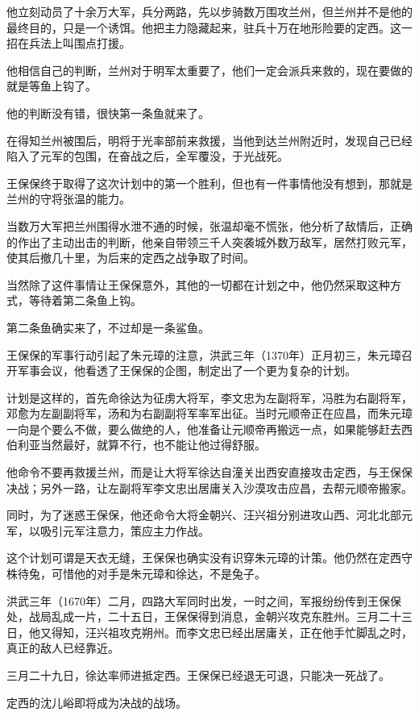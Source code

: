 \begin{multicols}{\theparacolNo}
		他立刻动员了十余万大军，兵分两路，先以步骑数万围攻兰州，但兰州并不是他的最终目的，只是一个诱饵。他把主力隐藏起来，驻兵十万在地形险要的定西。这一招在兵法上叫围点打援。

		他相信自己的判断，兰州对于明军太重要了，他们一定会派兵来救的，现在要做的就是等鱼上钩了。

		他的判断没有错，很快第一条鱼就来了。

		在得知兰州被围后，明将于光率部前来救援，当他到达兰州附近时，发现自己已经陷入了元军的包围，在奋战之后，全军覆没，于光战死。

		王保保终于取得了这次计划中的第一个胜利，但也有一件事情他没有想到，那就是兰州的守将张温的能力。

		当数万大军把兰州围得水泄不通的时候，张温却毫不慌张，他分析了敌情后，正确的作出了主动出击的判断，他亲自带领三千人突袭城外数万敌军，居然打败元军，使其后撤几十里，为后来的定西之战争取了时间。

		当然除了这件事情让王保保意外，其他的一切都在计划之中，他仍然采取这种方式，等待着第二条鱼上钩。

		第二条鱼确实来了，不过却是一条鲨鱼。

		王保保的军事行动引起了朱元璋的注意，洪武三年（1370年）正月初三，朱元璋召开军事会议，他看透了王保保的企图，制定出了一个更为复杂的计划。

		计划是这样的，首先命徐达为征虏大将军，李文忠为左副将军，冯胜为右副将军，邓愈为左副副将军，汤和为右副副将军率军出征。当时元顺帝正在应昌，而朱元璋一向是个要么不做，要么做绝的人，他准备让元顺帝再搬远一点，如果能够赶去西伯利亚当然最好，就算不行，也不能让他过得舒服。

		他命令不要再救援兰州，而是让大将军徐达自潼关出西安直接攻击定西，与王保保决战；另外一路，让左副将军李文忠出居庸关入沙漠攻击应昌，去帮元顺帝搬家。

		同时，为了迷惑王保保，他还命令大将金朝兴、汪兴祖分别进攻山西、河北北部元军，以吸引元军注意力，策应主力作战。

		这个计划可谓是天衣无缝，王保保也确实没有识穿朱元璋的计策。他仍然在定西守株待兔，可惜他的对手是朱元璋和徐达，不是兔子。

		洪武三年（1670年）二月，四路大军同时出发，一时之间，军报纷纷传到王保保处，战局乱成一片，二十五日，王保保得到消息，金朝兴攻克东胜州。三月二十三日，他又得知，汪兴祖攻克朔州。而李文忠已经出居庸关，正在他手忙脚乱之时，真正的敌人已经靠近。

		三月二十九日，徐达率师进抵定西。王保保已经退无可退，只能决一死战了。

		定西的沈儿峪即将成为决战的战场。


\end{multicols}

